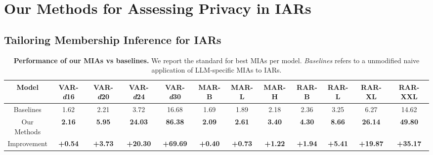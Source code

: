 \section{Our Methods for Assessing Privacy in IARs}
\label{sec:our_priv_eval}
\subsection{Tailoring Membership Inference for IARs}
\label{sec:membership}









\begin{table*}[h!]
    \centering
    \newcommand{\tightcolsep}{\setlength{\tabcolsep}{3pt}} %
    \tightcolsep %
    \scriptsize
    \caption{\textbf{Performance of our MIAs vs baselines.} We report the standard \tprat for best MIAs per model. \textit{Baselines} refers to a unmodified naive application of LLM-specific MIAs to IARs.}
    \begin{tabular}{cccccccccccc}
        \toprule
        \textbf{Model} & \textbf{VAR-\textit{d}16} & \textbf{VAR-\textit{d}20} & \textbf{VAR-\textit{d}24} & \textbf{VAR-\textit{d}30} & \textbf{MAR-B} & \textbf{MAR-L} & \textbf{MAR-H} & \textbf{RAR-B} & \textbf{RAR-L} & \textbf{RAR-XL} & \textbf{RAR-XXL} \\
        \midrule
        Baselines       & 1.62  & 2.21  & 3.72  & 16.68  & 1.69 & 1.89 & 2.18 & 2.36  & 3.25  & 6.27  & 14.62  \\
        Our Methods  & \textbf{2.16}  & \textbf{5.95}  & \textbf{24.03}  & \textbf{86.38}  & \textbf{2.09}  & \textbf{2.61}  & \textbf{3.40}  & \textbf{4.30}  & \textbf{8.66}  & \textbf{26.14}  & \textbf{49.80}  \\
        \midrule
        Improvement    & \textbf{+0.54} & \textbf{+3.73} & \textbf{+20.30} & \textbf{+69.69} & \textbf{+0.40} & \textbf{+0.73} & \textbf{+1.22} & \textbf{+1.94} & \textbf{+5.41} & \textbf{+19.87} & \textbf{+35.17} \\
        \bottomrule
    \end{tabular}
    \label{tab:mia_naive_vs_ours}
\end{table*}




